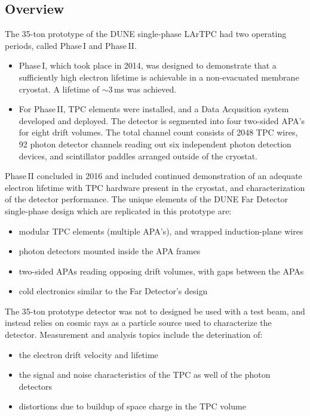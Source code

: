 \label{sec:35t}
\subsection{Overview}
The 35-ton prototype of the DUNE single-phase LArTPC had two operating periods, called Phase\,I and Phase\,II.
\begin{itemize}

\item Phase\,I, which took place in 2014, was designed to demonstrate that a sufficiently high electron
lifetime is achievable in a non-evacuated membrane cryostat. A lifetime of $\sim$3\,ms was achieved.

\item For Phase\,II, TPC elements were installed, and a Data Acqusition system developed and deployed. 
The detector is segmented into four two-sided APA's for eight drift volumes. The total channel count
consists of 2048 TPC wires, 92 photon detector channels reading out six independent photon
detection devices, and scintillator paddles arranged outside of the cryostat.

\end{itemize}

\noindent
Phase\,II concluded in 2016 and included continued demonstration of an adequate electron
lifetime with TPC hardware present in the cryostat, and characterization of the detector performance.
The unique elements of the DUNE Far Detector single-phase design which are replicated in this prototype are:
\begin{itemize}
\item  modular TPC elements (multiple APA's), and wrapped induction-plane wires
\item photon detectors mounted inside the APA frames
\item two-sided APAs reading opposing drift volumes, with gaps between the APAs
\item cold electronics similar to the Far Detector's design
\end{itemize}

\noindent
The 35-ton prototype detector was not to designed be used with a test beam, and instead relies on cosmic rays as
a particle source used to characterize the detector.
 Measurement and analysis topics include the deterination of:
\begin{itemize}
\item the electron drift velocity and lifetime
\item the signal and noise characteristics of the TPC as well of the photon detectors
\item distortions due to buildup of space charge in the TPC volume
\end{itemize}


